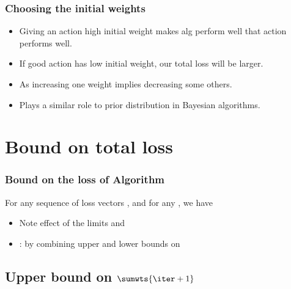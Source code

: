 \documentclass[handout]{beamer}
\begin{document}
\begin{frame} 
\frametitle{Choosing the initial weights} 

\begin{itemize}
\item Giving an action high initial weight makes alg perform well
   that action performs well.
\item If good action has low initial weight, our total loss will
  be larger.
\item As  increasing one weight
  implies decreasing some others.
\item Plays a similar role to prior distribution in Bayesian
  algorithms.
\end{itemize}

\end{frame} 

\section{Bound on total loss}
\begin{frame}
\frametitle{Bound on the loss of \ouralg Algorithm}
\begin{theorem} \label{thm:basic-bnd}
For any sequence of loss vectors ,
and for any , we have
\end{theorem}
\begin{itemize}
\item Note effect of the limits  and \R{$\eta \to \infty$}
\item
{}: by combining upper and lower bounds on 
\end{itemize}
\end{frame}

\subsection{Upper bound on $\sumwts{\iter+1}$}
\end{document}
